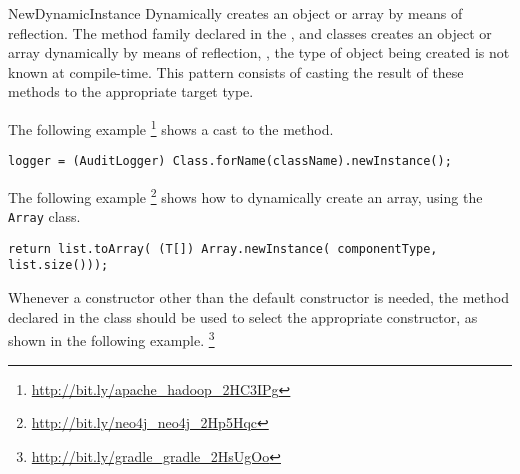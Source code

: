 \begin{pattern}{NewDynamicInstance}
%
%
Dynamically creates an object or array by means of reflection.
The  method family declared in the ,
and 
classes creates an object or array dynamically by means of reflection, \ie,
the type of object being created is not known at compile-time.
This pattern consists of casting the result of these methods to the appropriate target type.

\instances{}
The following example%
\footnote{\url{http://bit.ly/apache_hadoop_2HC3IPg}}
shows a cast to the 
method.

\begin{verbatim}
logger = (AuditLogger) Class.forName(className).newInstance();
\end{verbatim}

The following example%
\footnote{\url{http://bit.ly/neo4j_neo4j_2Hp5Hqc}}
shows how to dynamically create an array, using the \texttt{Array} class.

\begin{verbatim}
return list.toArray( (T[]) Array.newInstance( componentType, list.size()));
\end{verbatim}

Whenever a constructor other than the default constructor is needed,
the  method declared in the  class
should be used to select the appropriate constructor,
as shown in the following example.%
\footnote{\url{http://bit.ly/gradle_gradle_2HsUgOo}}


\end{pattern}
